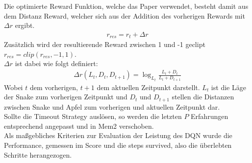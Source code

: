 Die optimierte Reward Funktion, welche das Paper verwendet, besteht damit aus dem Distanz Reward, welcher sich aus der Addition des vorherigen Rewards mit $\Delta r$ ergibt.
\begin{align}
	r_{res} = r_t + \Delta r
\end{align}
Zusätzlich wird der resultierende Reward zwischen 1 und -1 geclipt $r_{res} = clip(r_{res}, -1, 1)$.\\
$\Delta r$ ist dabei wie folgt definiert:
\begin{align}
	\Delta r(L_t, D_t,D_{t+1}) = \log_{L_t}\frac{L_t + D_t}{L_t + D_{t + 1}}
\end{align}
Wobei $t$ dem vorherigen, $t+1$ dem aktuellen Zeitpunkt darstellt. $L_t$ ist die Läge der Snake zum vorherigen Zeitpunkt und $D_t$ und $D_{t+1}$ stellen die Distanzen zwischen Snake und Apfel zum vorherigen und aktuellen Zeitpunkt dar.\\
Sollte die Timeout Strategy auslösen, so werden die letzten $P$ Erfahrungen entsprechend angepasst und in Mem2 verschoben.\\
Als maßgebliches Kriterien zur Evaluation der Leistung des DQN wurde die Performance, gemessen im Score und die steps survived, also die überlebten Schritte herangezogen.

